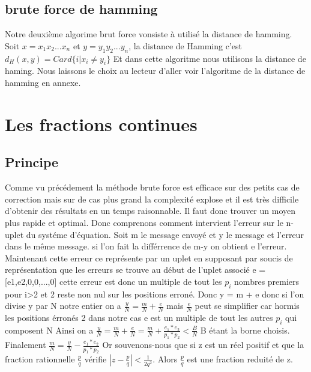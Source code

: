 \documentclass[a4paper, 11pt]{article}
\begin{document}
\newpage
\subsection{brute force de hamming}
Notre deuxième algorime brut force vonsiste à utilisé la distance de hamming. Soit $x=x_1x_2 ... x_n$ et $y=y_1y_2 ... y_n$, la distance de Hamming c'est
$d_H(x,y)=Card\{  i\vert x_i \neq y_i \}$ \newline
Et dans cette algoritme nous utilisons la distance de haming. Nous laissons le choix au lecteur d'aller voir l'algoritme de la distance de hamming en annexe.


\newpage
\section{Les fractions continues} 
\subsection{Principe}
    Comme vu précédement la méthode brute force est efficace sur des petits cas de correction mais sur de cas plus grand la complexité explose et il est très difficile d'obtenir des résultats en un temps raisonnable.\newline
Il faut donc trouver un moyen plus rapide et optimal. Donc comprenons comment intervient l'erreur sur le n-uplet du systéme d'équation.\newline
Soit m le message envoyé et y le message et l'erreur dans le même message. si l'on fait la différrence de m-y on obtient e l'erreur.
Maintenant cette erreur ce représente par un uplet en supposant par soucis de représentation que les erreurs se trouve au début de l'uplet associé
e = [e1,e2,0,0,...,0] cette erreur est donc un multiple de tout les $p_i$ nombres premiers pour i>2 et 2  reste non nul sur les positions erroné.\newline
Donc y = m + e donc si l'on divise y par N notre entier on a $\frac{y}{N}=\frac{m}{N}+\frac{e}{N}$\newline
mais $\frac{e}{N}$ peut se simplifier car hormis les positions érronés 2 dans notre cas e est un multiple de tout les autres $p_i$ qui composent N\newline
Ainsi on a  $\frac{y}{N}=\frac{m}{N}+\frac{e}{N}=\frac{m}{N}+ \frac{e_1 * e_2}{p_1 * p_2 } <\frac{B}{N} $    B étant la borne choisis.\newline
Finalement $\frac{m}{N}=\frac{y}{N} - \frac{e_1 * e_2}{p_1 * p_2 } $ \newline
\newline
Or souvenons-nous que si z est un réel positif et que la fraction rationnelle $\frac{p}{q}$
vérifie $ \left| z - \frac{p}{q} \right| < \frac{1}{2q^2} $. 
Alors $\frac{p}{q}$ est une fraction reduité de z.\newline
\newline
\end{document}
